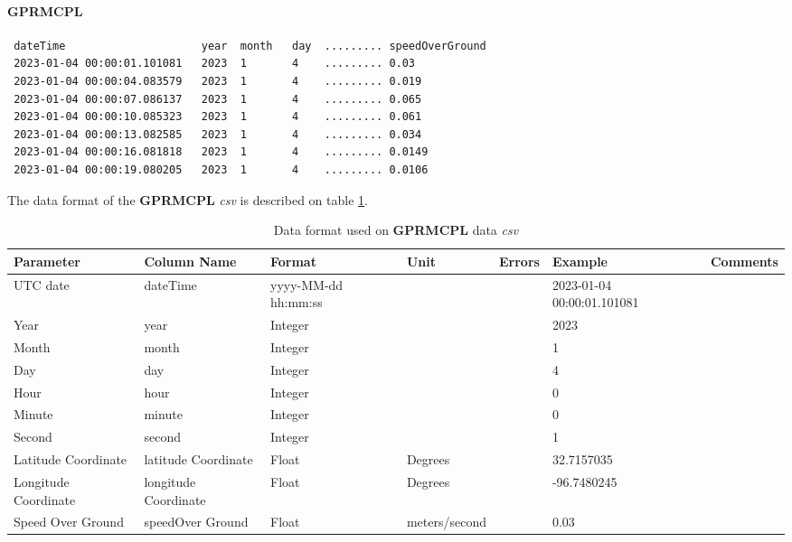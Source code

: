 \documentclass[12pt]{article}
\begin{document}
\paragraph{GPRMCPL}
    \label{sec:gprmcplDataFormat}
{  
\begin{verbatim}
 dateTime                     year  month   day  ......... speedOverGround
 2023-01-04 00:00:01.101081   2023  1       4    ......... 0.03 
 2023-01-04 00:00:04.083579   2023  1       4    ......... 0.019
 2023-01-04 00:00:07.086137   2023  1       4    ......... 0.065
 2023-01-04 00:00:10.085323   2023  1       4    ......... 0.061
 2023-01-04 00:00:13.082585   2023  1       4    ......... 0.034
 2023-01-04 00:00:16.081818   2023  1       4    ......... 0.0149
 2023-01-04 00:00:19.080205   2023  1       4    ......... 0.0106
\end{verbatim} } 
         The data format of the \textbf{GPRMCPL} \emph{csv} is described on table \ref{t:dataFormatgprmcpl}.
        
        \begin{table}[H]
        	\caption{Data format used on \textbf{GPRMCPL} data \emph{csv}}
        	 \label{t:dataFormatgprmcpl}
        	\small
        	\begin{tabular}{||p{2cm}| p{2cm}|p{2cm}|p{1.5cm}|p{1.5cm}|p{2cm}|p{2cm}||}
        		\hline
        		\hline
        		Parameter & Column Name & Format & Unit & Errors&Example & Comments \\
                \hline
                \hline
        	UTC date & dateTime & yyyy-MM-dd hh:mm:ss & & & \tiny 2023-01-04 00:00:01.101081 &  \\
        	\hline
                Year & year & Integer &   & & 2023 & \\
                \hline
                Month & month & Integer &   & & 1 & \\
                \hline
                Day & day & Integer &   & & 4 & \\
                \hline
        	Hour & hour & Integer &   & & 0 & \\
                \hline
                Minute & minute & Integer &   & & 0 & \\
                \hline
                Second & second & Integer &   & & 1 & \\
                \hline
                Latitude \hbox{Coordinate} & latitude
                                     \hbox{Coordinate}  & Float & Degrees  & & 32.7157035 & \\
                \hline
                Longitude Coordinate& longitude
                                       \hbox{Coordinate}  & Float & Degrees & & -96.7480245 & \\
                \hline
               Speed Over Ground & speedOver \hbox{Ground}  & Float & \tiny meters/second & & 0.03 & \\
                \hline
                \hline
        	\end{tabular}
        \end{table}
\clearpage
 
\end{document}
